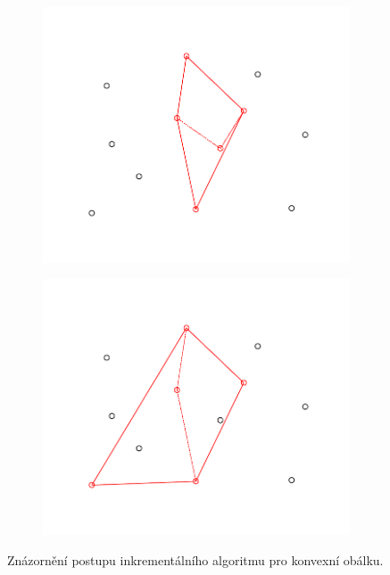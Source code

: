 \begin{figure}[h]
\begin{subfigure}{0.5\textwidth}
  \includegraphics[width=\linewidth]{./pictures/4/incremental_hull_3.pdf}
  \label{fig:3-douglas-peucker_3}
\end{subfigure}\hfil %
\begin{subfigure}{0.5\textwidth}
  \includegraphics[width=\linewidth]{./pictures/4/incremental_hull_4.pdf}
  \label{fig:3-douglas-peucker_4}
\end{subfigure}\hfil %
\caption{Znázornění postupu inkrementálního algoritmu pro konvexní obálku.}
\end{figure}